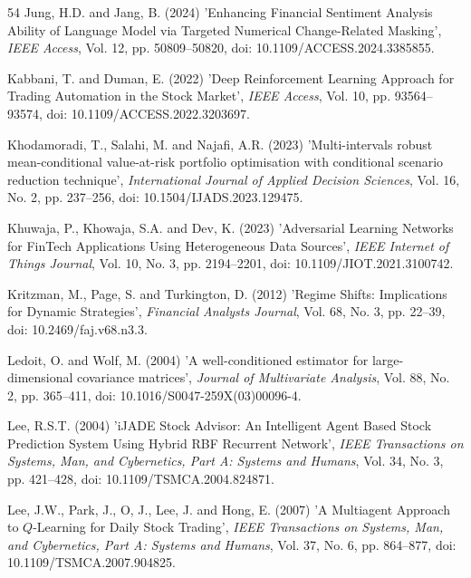 \documentclass{singlecol-new}
\theoremstyle{TH}{
\newtheorem{lemma}{Lemma}
\newtheorem{theorem}[lemma]{Theorem}
\newtheorem{corrolary}[lemma]{Corrolary}
\newtheorem{conjecture}[lemma]{Conjecture}
\newtheorem{proposition}[lemma]{Proposition}
\newtheorem{claim}[lemma]{Claim}
\newtheorem{stheorem}[lemma]{Wrong Theorem}
\newtheorem{algorithm}{Algorithm}
}
\theoremstyle{THrm}{
\newtheorem{definition}{Definition}[section]
\newtheorem{question}{Question}[section]
\newtheorem{remark}{Remark}
\newtheorem{scheme}{Scheme}
}
\theoremstyle{THhit}{
\newtheorem{case}{Case}[section]
}
\begin{document}
\begin{thebibliography}{54}
Jung, H.D. and Jang, B. (2024) 'Enhancing Financial Sentiment Analysis Ability of Language Model via Targeted Numerical Change-Related Masking', {\it IEEE Access}, Vol. 12, pp. 50809--50820, doi: 10.1109/ACCESS.2024.3385855.

Kabbani, T. and Duman, E. (2022) 'Deep Reinforcement Learning Approach for Trading Automation in the Stock Market', {\it IEEE Access}, Vol. 10, pp. 93564--93574, doi: 10.1109/ACCESS.2022.3203697.

Khodamoradi, T., Salahi, M. and Najafi, A.R. (2023) 'Multi-intervals robust mean-conditional value-at-risk portfolio optimisation with conditional scenario reduction technique', {\it International Journal of Applied Decision Sciences}, Vol. 16, No. 2, pp. 237--256, doi: 10.1504/IJADS.2023.129475.

Khuwaja, P., Khowaja, S.A. and Dev, K. (2023) 'Adversarial Learning Networks for FinTech Applications Using Heterogeneous Data Sources', {\it IEEE Internet of Things Journal}, Vol. 10, No. 3, pp. 2194--2201, doi: 10.1109/JIOT.2021.3100742.

Kritzman, M., Page, S. and Turkington, D. (2012) 'Regime Shifts: Implications for Dynamic Strategies', {\it Financial Analysts Journal}, Vol. 68, No. 3, pp. 22--39, doi: 10.2469/faj.v68.n3.3.

Ledoit, O. and Wolf, M. (2004) 'A well-conditioned estimator for large-dimensional covariance matrices', {\it Journal of Multivariate Analysis}, Vol. 88, No. 2, pp. 365--411, doi: 10.1016/S0047-259X(03)00096-4.

Lee, R.S.T. (2004) 'iJADE Stock Advisor: An Intelligent Agent Based Stock Prediction System Using Hybrid RBF Recurrent Network', {\it IEEE Transactions on Systems, Man, and Cybernetics, Part A: Systems and Humans}, Vol. 34, No. 3, pp. 421--428, doi: 10.1109/TSMCA.2004.824871.

Lee, J.W., Park, J., O, J., Lee, J. and Hong, E. (2007) 'A Multiagent Approach to $Q$-Learning for Daily Stock Trading', {\it IEEE Transactions on Systems, Man, and Cybernetics, Part A: Systems and Humans}, Vol. 37, No. 6, pp. 864--877, doi: 10.1109/TSMCA.2007.904825.


\end{thebibliography}
\end{document}
